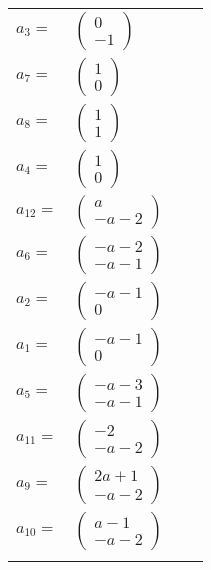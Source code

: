 \documentclass[1p]{elsarticle_modified}
\theoremstyle{definition}
\begin{document}
\begin{tabular}{m{7pt} m{180pt} m{7pt} m{180pt} }
\flushright $a_{3}=$&$\begin{pmatrix}0\\-1\end{pmatrix}$ \\
\flushright $a_{7}=$&$\begin{pmatrix}1\\0\end{pmatrix}$ \\
\flushright $a_{8}=$&$\begin{pmatrix}1\\1\end{pmatrix}$ \\
\flushright $a_{4}=$&$\begin{pmatrix}1\\0\end{pmatrix}$ \\
\flushright $a_{12}=$&$\begin{pmatrix}a\\- a-2\end{pmatrix}$ \\
\flushright $a_{6}=$&$\begin{pmatrix}- a-2\\- a-1\end{pmatrix}$ \\
\flushright $a_{2}=$&$\begin{pmatrix}- a-1\\0\end{pmatrix}$ \\
\flushright $a_{1}=$&$\begin{pmatrix}- a-1\\0\end{pmatrix}$ \\
\flushright $a_{5}=$&$\begin{pmatrix}- a-3\\- a-1\end{pmatrix}$ \\
\flushright $a_{11}=$&$\begin{pmatrix}-2\\- a-2\end{pmatrix}$ \\
\flushright $a_{9}=$&$\begin{pmatrix}2 a+1\\- a-2\end{pmatrix}$ \\
\flushright $a_{10}=$&$\begin{pmatrix}a-1\\- a-2\end{pmatrix}$\\&\end{tabular}
\end{document}

